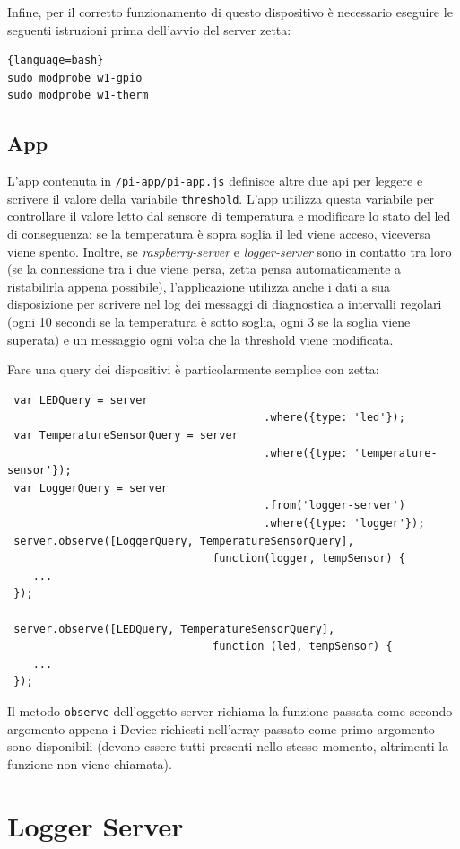 \documentclass[]{scrartcl}
\begin{document}
Infine, per il corretto funzionamento di questo dispositivo è necessario eseguire le seguenti istruzioni prima dell'avvio del server zetta:
\begin{lstlisting}{language=bash}
sudo modprobe w1-gpio 
sudo modprobe w1-therm
\end{lstlisting}

\subsection{App}

L'app contenuta in \texttt{/pi-app/pi-app.js} definisce altre due api per leggere e scrivere il valore della variabile \texttt{threshold}. L'app utilizza questa variabile per controllare il valore letto dal sensore di temperatura e modificare lo stato del led di conseguenza: se la temperatura è sopra soglia il led viene acceso, viceversa viene spento.
Inoltre, se \textit{raspberry-server} e \textit{logger-server} sono in contatto tra loro (se la connessione tra i due viene persa, zetta pensa automaticamente a ristabilirla appena possibile), l'applicazione utilizza anche i dati a sua disposizione per scrivere nel log dei messaggi di diagnostica a intervalli regolari (ogni 10 secondi se la temperatura è sotto soglia, ogni 3 se la soglia viene superata) e un messaggio ogni volta che la threshold viene modificata.

Fare una query dei dispositivi è particolarmente semplice con zetta:

\begin{lstlisting}
 var LEDQuery = server
 										.where({type: 'led'});
 var TemperatureSensorQuery = server
 										.where({type: 'temperature-sensor'});
 var LoggerQuery = server
 										.from('logger-server')
 										.where({type: 'logger'});
 server.observe([LoggerQuery, TemperatureSensorQuery], 
 								function(logger, tempSensor) {
 	...
 });
 
 server.observe([LEDQuery, TemperatureSensorQuery], 
 								function (led, tempSensor) {
 	...
 });
\end{lstlisting}

Il metodo \texttt{observe} dell'oggetto server richiama la funzione passata come secondo argomento appena i Device richiesti nell'array passato come primo argomento sono disponibili (devono essere tutti presenti nello stesso momento, altrimenti la funzione non viene chiamata). 

\section{Logger Server}
\end{document}
